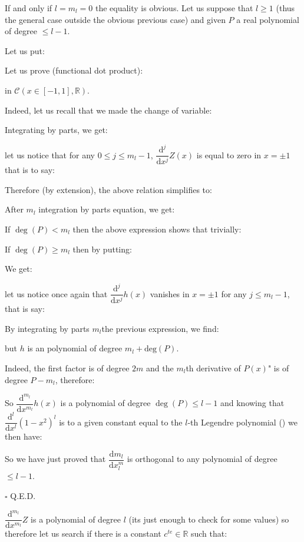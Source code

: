 	\begin{dem}
	If and only if $l=m_l=0$ the equality is obvious. Let us suppose that $l\geq 1$ (thus the general case outside the obvious previous case) and given $P$ a real polynomial of degree $\leq l-1$.

	Let us put:
	
	Let us prove (functional dot product):
	
	in  $\mathcal{C}(x\in[-1,1],\mathbb{R})$.
	
	Indeed, let us recall that we made the change of variable:
	
	Integrating by parts, we get:
	
	let us notice that for any $0\leq j\leq m_l-1$, $\dfrac{\mathrm{d}^j}{\mathrm{d}x^j}Z(x)$ is equal to zero in $x=\pm 1$ that is to say:
	
	Therefore (by extension), the above relation simplifies to:
	
	After $m_l$ integration by parts equation, we get:
	
	If $\deg(P)<m_l$ then the above expression shows that trivially:
	
	If $\deg(P)\geq m_l$ then by putting:
	
	We get:
	
	let us notice once again that $\dfrac{\mathrm{d}^j}{\mathrm{d}x^j}h(x)$ vanishes in $x=\pm 1$ for any $j\leq m_l-1$, that is say:
	
	By integrating by parts $m_l$the previous expression, we find:
	
	but $h$ is an polynomial of degree $m_l+\text{deg}(P)$.
	
	Indeed, the first factor is of degree $2m$ and the $m_l$th derivative of $P(x)$" is of degree $P-m_l$, therefore:
	
	So $\dfrac{\mathrm{d}^{m_l}}{\mathrm{d}x^{m_l}}h(x)$ is a polynomial of degree $\deg(P)\leq l-1$ and knowing that $\dfrac{\mathrm{d}^l}{\mathrm{d}x^l}(1-x^2)^l$ is to a given constant equal to the $l$-th Legendre polynomial () we then have:
	
	So we have just proved that $\dfrac{\mathrm{d}m_l}{\mathrm{d}x^{m}_l}$ is orthogonal to any polynomial of degree $\leq l-1$.
	\begin{flushright}
		$\square$  Q.E.D.
	\end{flushright}
	\end{dem}
	$\dfrac{\mathrm{d}^{m_l}}{\mathrm{d}x^{m_l}}Z$ is a polynomial of degree $l$ (its just enough to check for some values) so therefore let us search if there is a constant $c^{te}\in\mathbb{R}$ such that:
	
